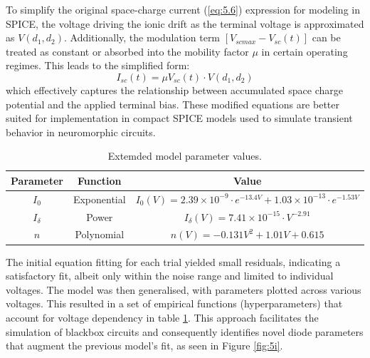 \noindent To simplify the original space-charge current (\ref{eq:5.6}) expression for modeling in SPICE, the voltage driving the ionic drift as the terminal voltage is approximated as $V(d_1, d_2)$. Additionally, the modulation term $\left[ V_{scmax} - V_{sc}(t) \right]$ can be treated as constant or absorbed into the mobility factor $\mu$ in certain operating regimes. This leads to the simplified form:
\begin{equation}
I_{sc}(t) = \mu V_{sc}(t) \cdot V(d_1, d_2) \label{eq:5.10}
\end{equation}
which effectively captures the relationship between accumulated space charge potential and the applied terminal bias. These modified equations are better suited for implementation in compact SPICE models used to simulate transient behavior in neuromorphic circuits. 

\begin{table}[ht]
    \caption{Extemded model parameter values.}
    \centering
    \begin{tabular}{|c|c|c|}
    \hline
    Parameter   & Function                & Value                                      \\ \hline
    $I_0$       & Exponential             & $I_0(V) = 2.39\times10^{-9}\cdot e^{-13.4V} + 1.03\times 10^{-13}\cdot e^{-1.53V}$         \\ \hline
    $I_{\delta}$    & Power                  & $I_{\delta}(V)=7.41\times 10^{-15} \cdot V^{-2.91}$                 \\ \hline
    $n$ & Polynomial                & $n(V)=-0.131V^2 + 1.01V + 0.615$                         \\ \hline
    \end{tabular}
    \label{table:5c}
\end{table}

\noindent The initial equation fitting for each trial yielded small residuals, indicating a satisfactory fit, albeit only within the noise range and limited to individual voltages. The model was then generalised, with parameters plotted across various voltages. This resulted in a set of empirical functions (hyperparameters) that account for voltage dependency in table \ref{table:5c}. This approach facilitates the simulation of blackbox circuits and consequently identifies novel diode parameters that augment the previous model's fit, as seen in Figure \ref{fig:5i}.\\

